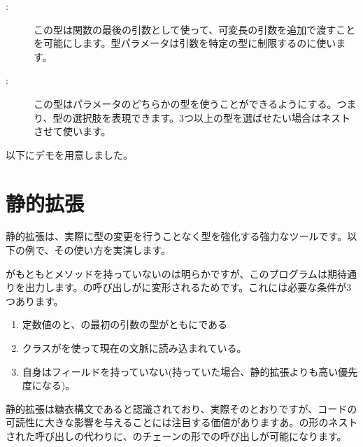 \begin{description}
	\item[:] この型は関数の最後の引数として使って、可変長の引数を追加で渡すことを可能にします。型パラメータは引数を特定の型に制限するのに使います。
	\item[:] この型はパラメータのどちらかの型を使うことができるようにする。つまり、型の選択肢を表現できます。3つ以上の型を選ばせたい場合はネストさせて使います。
\end{description}

以下にデモを用意しました。



\section{静的拡張}
\label{lf-static-extension}


静的拡張は、実際に型の変更を行うことなく型を強化する強力なツールです。以下の例で、その使い方を実演します。


がもともとメソッドを持っていないのは明らかですが、このプログラムは期待通りを出力します。の呼び出しがに変形されるためです。これには必要な条件が3つあります。

\begin{enumerate}
	\item 定数値のと、の最初の引数の型がともにである
	\item {}クラスがを使って現在の文脈に読み込まれている。
	\item {}自身はフィールドを持っていない(持っていた場合、静的拡張よりも高い優先度になる)。
\end{enumerate}

静的拡張は糖衣構文であると認識されており、実際そのとおりですが、コードの可読性に大きな影響を与えることには注目する価値がありますあ。の形のネストされた呼び出しの代わりに、のチェーンの形での呼び出しが可能になります。

